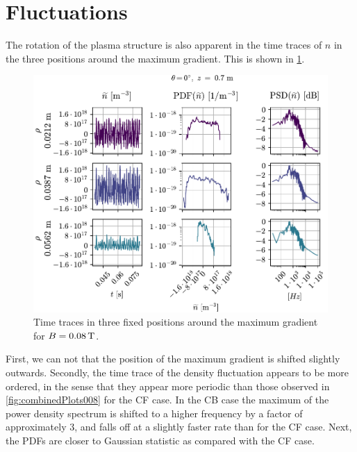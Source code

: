 \section{Fluctuations}
%
The rotation of the plasma structure is also apparent in the time traces of $n$ in the three positions around the maximum gradient.
This is shown in \cref{fig:comb008B}.
%
\begin{figure}[htb]
    \centering
    \includegraphics{fig/results/compareBouss/comb008B}
    \caption{Time traces in three fixed positions around the maximum gradient for $B=0.08\, \text{T}$.}
    \label{fig:comb008B}
\end{figure}
%
First, we can not that the position of the maximum gradient is shifted slightly outwards.
Secondly, the time trace of the density fluctuation appears to be more ordered, in the sense that they appear more periodic than those observed in \cref{fig:combinedPlots008} for the CF case.
In the CB case the maximum of the power density spectrum is shifted to a higher frequency by a factor of approximately $3$, and falls off at a slightly faster rate than for the CF case.
Next, the PDFs are closer to Gaussian statistic as compared with the CF case.

